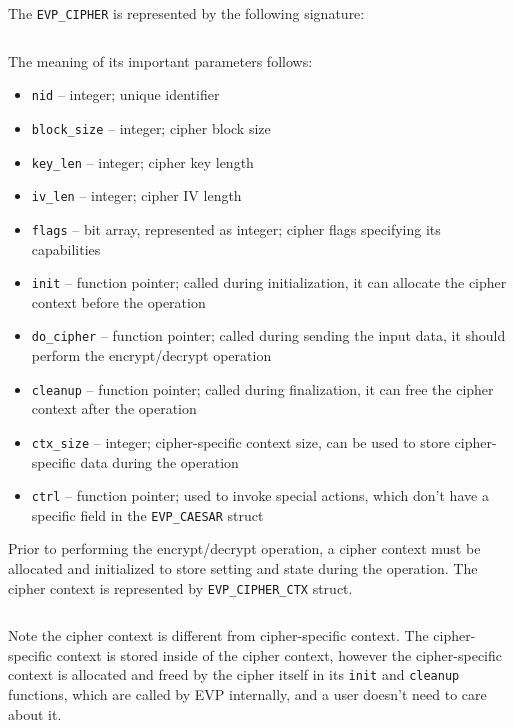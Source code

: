 \inputminted{c}{code/openssl-evp-ciphers.c}

The \texttt{EVP\_CIPHER} is represented by the following signature:

\inputminted{c}{code/openssl-evp-cipher.c}

The meaning of its important parameters follows:

\begin{itemize}
  \item \texttt{nid} -- integer; unique identifier
  \item \texttt{block\_size} -- integer; cipher block size
  \item \texttt{key\_len} -- integer; cipher key length
  \item \texttt{iv\_len} -- integer; cipher IV length
  \item \texttt{flags} -- bit array, represented as integer; cipher flags specifying its capabilities
  \item \texttt{init} -- function pointer; called during initialization, it can allocate the cipher context before the operation
  \item \texttt{do\_cipher} -- function pointer; called during sending the input data, it should perform the encrypt/decrypt operation
  \item \texttt{cleanup} -- function pointer; called during finalization, it can free the cipher context after the operation
  \item \texttt{ctx\_size} -- integer; cipher-specific context size, can be used to store cipher-specific data during the operation
  \item \texttt{ctrl} -- function pointer; used to invoke special actions, which don't have a specific field in the \texttt{EVP\_CAESAR} struct
\end{itemize}

Prior to performing the encrypt/decrypt operation, a cipher context must be allocated and initialized to store setting and state during the operation. The cipher context is represented by \texttt{EVP\_CIPHER\_CTX} struct.

\inputminted{c}{code/openssl-evp-cipher-ctx-new.c}

Note the cipher context is different from cipher-specific context. The cipher-specific context is stored inside of the cipher context, however the cipher-specific context is allocated and freed by the cipher itself in its \texttt{init} and \texttt{cleanup} functions, which are called by EVP internally, and a user doesn't need to care about it.

